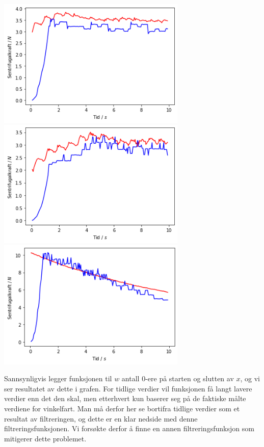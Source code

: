 \documentclass{article}
\begin{document}
\begin{center}
    \includegraphics[width=9cm]{data_300_10_low_pass_filter.png} \\
    \includegraphics[width=9cm]{data_200_10_low_pass_filter.png} \\
    \includegraphics[width=9cm]{data_300_14_low_pass_filter.png}
\end{center}

Sannsynligvis legger funksjonen til $w$ antall 0-ere på starten og slutten av $x$, og vi ser resultatet av dette i grafen. For tidlige verdier vil funksjonen 
få langt lavere verdier enn det den skal, men etterhvert kun baserer seg på de faktiske målte verdiene for vinkelfart. Man må derfor her se bortifra tidlige verdier 
som et resultat av filtreringen, og dette er en klar nedside med denne filtreringsfunksjonen. Vi forsøkte derfor å finne en annen filtreringsfunksjon som mitigerer dette problemet.
\end{document}
